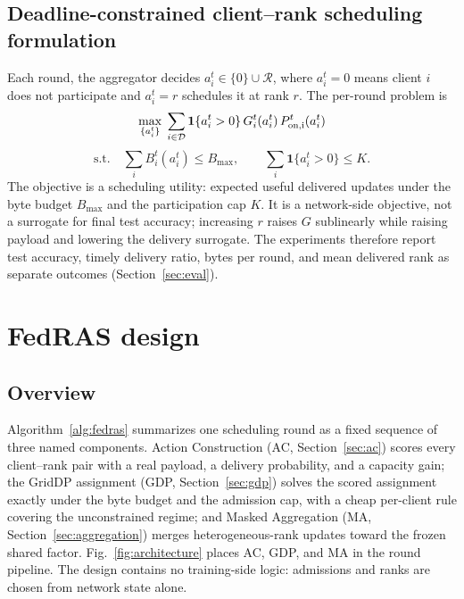 \documentclass[a4paper,fleqn]{cas-dc}
\begin{document}
\subsection{Deadline-constrained client--rank scheduling formulation}
\label{sec:problem}

Each round, the aggregator decides $a_i^t\in\{0\}\cup\mathcal R$, where $a_i^t=0$ means client $i$ does not participate and $a_i^t=r$ schedules it at rank $r$. The per-round problem is
\begin{equation}
\max_{\{a_i^t\}}\;\sum_{i\in\mathcal D}\mathbf 1\{a_i^t>0\}\,G_i^t(a_i^t)\,P_{\rm on,i}^t(a_i^t)
\label{eq:objective}
\end{equation}
\begin{equation}
\text{s.t.}\quad \sum_i B_i^t(a_i^t)\le B_{\max},\qquad \sum_i\mathbf 1\{a_i^t>0\}\le K .
\label{eq:constraints}
\end{equation}
The objective is a scheduling utility: expected useful delivered updates under the byte budget $B_{\max}$ and the participation cap $K$. It is a network-side objective, not a surrogate for final test accuracy; increasing $r$ raises $G$ sublinearly while raising payload and lowering the delivery surrogate. The experiments therefore report test accuracy, timely delivery ratio, bytes per round, and mean delivered rank as separate outcomes (Section~\ref{sec:eval}).

\section{FedRAS design}
\label{sec:solver}

\subsection{Overview}
Algorithm~\ref{alg:fedras} summarizes one scheduling round as a fixed sequence of three named components. Action Construction (AC, Section~\ref{sec:ac}) scores every client--rank pair with a real payload, a delivery probability, and a capacity gain; the GridDP assignment (GDP, Section~\ref{sec:gdp}) solves the scored assignment exactly under the byte budget and the admission cap, with a cheap per-client rule covering the unconstrained regime; and Masked Aggregation (MA, Section~\ref{sec:aggregation}) merges heterogeneous-rank updates toward the frozen shared factor. Fig.~\ref{fig:architecture} places AC, GDP, and MA in the round pipeline. The design contains no training-side logic: admissions and ranks are chosen from network state alone.
\end{document}
